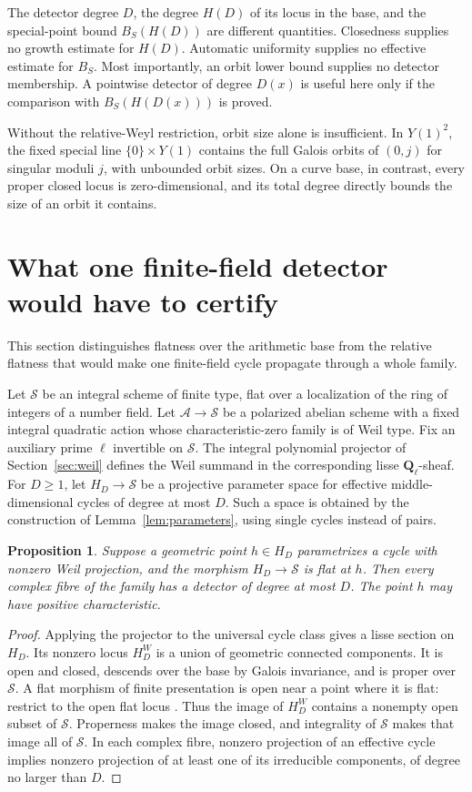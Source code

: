 \documentclass[11pt]{article}
\newtheorem{proposition}[theorem]{Proposition}
\theoremstyle{definition}
\theoremstyle{remark}
\newcommand{\Q}{\mathbf Q}
\begin{document}
The detector degree $D$, the degree $H(D)$ of its locus in the base, and the special-point bound $B_S(H(D))$ are different quantities. Closedness supplies no growth estimate for $H(D)$. Automatic uniformity supplies no effective estimate for $B_S$. Most importantly, an orbit lower bound supplies no detector membership. A pointwise detector of degree $D(x)$ is useful here only if the comparison with $B_S(H(D(x)))$ is proved.

Without the relative-Weyl restriction, orbit size alone is insufficient. In $Y(1)^2$, the fixed special line $\{0\}\times Y(1)$ contains the full Galois orbits of $(0,j)$ for singular moduli $j$, with unbounded orbit sizes. On a curve base, in contrast, every proper closed locus is zero-dimensional, and its total degree directly bounds the size of an orbit it contains.
\section{What one finite-field detector would have to certify}
\label{sec:one-prime}
This section distinguishes flatness over the arithmetic base from the relative flatness that would make one finite-field cycle propagate through a whole family.

Let $\mathcal S$ be an integral scheme of finite type, flat over a localization of the ring of integers of a number field. Let $\mathcal A\to\mathcal S$ be a polarized abelian scheme with a fixed integral quadratic action whose characteristic-zero family is of Weil type. Fix an auxiliary prime $\ell$ invertible on $\mathcal S$. The integral polynomial projector of Section~\ref{sec:weil} defines the Weil summand in the corresponding lisse $\Q_\ell$-sheaf. For $D\ge1$, let $H_D\to\mathcal S$ be a projective parameter space for effective middle-dimensional cycles of degree at most $D$. Such a space is obtained by the construction of Lemma~\ref{lem:parameters}, using single cycles instead of pairs.

\begin{proposition}\label{prop:flat-detector-witness}
Suppose a geometric point $h\in H_D$ parametrizes a cycle with nonzero Weil projection, and the morphism $H_D\to\mathcal S$ is flat at $h$. Then every complex fibre of the family has a detector of degree at most $D$. The point $h$ may have positive characteristic.
\end{proposition}

\begin{proof}
Applying the projector to the universal cycle class gives a lisse section on $H_D$. Its nonzero locus $H_D^{W}$ is a union of geometric connected components. It is open and closed, descends over the base by Galois invariance, and is proper over $\mathcal S$. A flat morphism of finite presentation is open near a point where it is flat: restrict to the open flat locus \cite[Theorems~2.4.6 and 11.1.1]{EGAIV}. Thus the image of $H_D^{W}$ contains a nonempty open subset of $\mathcal S$. Properness makes the image closed, and integrality of $\mathcal S$ makes that image all of $\mathcal S$. In each complex fibre, nonzero projection of an effective cycle implies nonzero projection of at least one of its irreducible components, of degree no larger than $D$.
\end{proof}
\end{document}
